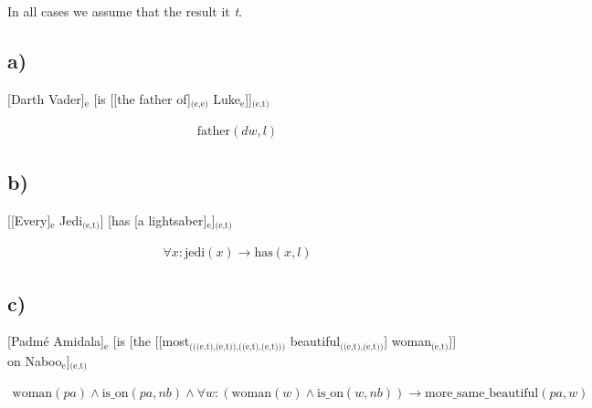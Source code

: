 \documentclass{article}
\renewcommand\t[1]{\text{#1}}
\newcommand\lwt[1]{$_\text{#1}$}
\begin{document}

\section{}

In all cases we assume that the result it \textit{t}.

\subsection*{a)}

[Darth Vader]\lwt{e}
[is [[the father of]\lwt{(e,e)} Luke\lwt{e}]]\lwt{(e,t)}

\begin{gather*}
\t{father}(dw, l)
\end{gather*}

\subsection*{b)}

[[Every]\lwt{e} Jedi\lwt{(e,t)}]
[has [a lightsaber]\lwt{e}]\lwt{(e,t)}


\begin{gather*}
\forall x: \t{jedi}(x) \rightarrow \t{has}(x,l)
\end{gather*}

\subsection*{c)}

[Padmé Amidala]\lwt{e}
[is
[the [[most\lwt{(((e,t),(e,t)),((e,t),(e,t)))} beautiful\lwt{((e,t),(e,t))}] woman\lwt{(e,t)}]]
on Naboo\lwt{e}]\lwt{(e,t)}


\begin{gather*}
\t{woman}(pa) \wedge \t{is\_on}(pa,nb) \wedge \forall w: (\t{woman}(w)\wedge \t{is\_on}(w,nb)) \rightarrow  \t{more\_same\_beautiful}(pa,w)
\end{gather*}


\section{}

\subsection{}
\end{document}

